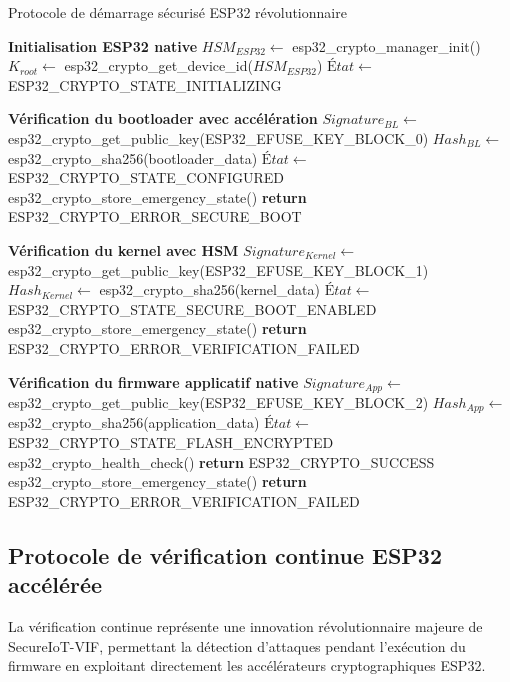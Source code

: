 \begin{algorithm}
\caption{Protocole de démarrage sécurisé ESP32 révolutionnaire}
\label{alg:secure-boot-esp32}
\begin{algorithmic}[1]
\State \textbf{Initialisation ESP32 native}
\State $HSM_{ESP32} \leftarrow$ esp32\_crypto\_manager\_init()
\State $K_{root} \leftarrow$ esp32\_crypto\_get\_device\_id($HSM_{ESP32}$)
\State $État \leftarrow$ ESP32\_CRYPTO\_STATE\_INITIALIZING

\State \textbf{Vérification du bootloader avec accélération}
\State $Signature_{BL} \leftarrow$ esp32\_crypto\_get\_public\_key(ESP32\_EFUSE\_KEY\_BLOCK\_0)
\State $Hash_{BL} \leftarrow$ esp32\_crypto\_sha256(bootloader\_data)
    \State $État \leftarrow$ ESP32\_CRYPTO\_STATE\_CONFIGURED
\Else
    \State esp32\_crypto\_store\_emergency\_state()
    \State \textbf{return} ESP32\_CRYPTO\_ERROR\_SECURE\_BOOT
\EndIf

\State \textbf{Vérification du kernel avec HSM}
\State $Signature_{Kernel} \leftarrow$ esp32\_crypto\_get\_public\_key(ESP32\_EFUSE\_KEY\_BLOCK\_1)
\State $Hash_{Kernel} \leftarrow$ esp32\_crypto\_sha256(kernel\_data)
    \State $État \leftarrow$ ESP32\_CRYPTO\_STATE\_SECURE\_BOOT\_ENABLED
\Else
    \State esp32\_crypto\_store\_emergency\_state()
    \State \textbf{return} ESP32\_CRYPTO\_ERROR\_VERIFICATION\_FAILED
\EndIf

\State \textbf{Vérification du firmware applicatif native}
\State $Signature_{App} \leftarrow$ esp32\_crypto\_get\_public\_key(ESP32\_EFUSE\_KEY\_BLOCK\_2)
\State $Hash_{App} \leftarrow$ esp32\_crypto\_sha256(application\_data)
    \State $État \leftarrow$ ESP32\_CRYPTO\_STATE\_FLASH\_ENCRYPTED
    \State esp32\_crypto\_health\_check()
    \State \textbf{return} ESP32\_CRYPTO\_SUCCESS
\Else
    \State esp32\_crypto\_store\_emergency\_state()
    \State \textbf{return} ESP32\_CRYPTO\_ERROR\_VERIFICATION\_FAILED
\EndIf
\end{algorithmic}
\end{algorithm}

\subsection{Protocole de vérification continue ESP32 accélérée}

La vérification continue représente une innovation révolutionnaire majeure de SecureIoT-VIF, permettant la détection d'attaques pendant l'exécution du firmware en exploitant directement les accélérateurs cryptographiques ESP32.

